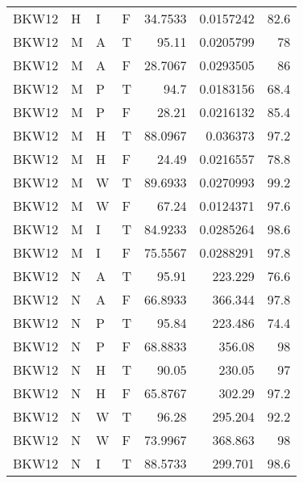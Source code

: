 \begin{longtable}{llllrrr}
    BKW12    & H         & I         & F          & 34.7533    & 0.0157242   & 82.6     \\
    BKW12    & M         & A         & T          & 95.11      & 0.0205799   & 78       \\
    BKW12    & M         & A         & F          & 28.7067    & 0.0293505   & 86       \\
    BKW12    & M         & P         & T          & 94.7       & 0.0183156   & 68.4     \\
    BKW12    & M         & P         & F          & 28.21      & 0.0216132   & 85.4     \\
    BKW12    & M         & H         & T          & 88.0967    & 0.036373    & 97.2     \\
    BKW12    & M         & H         & F          & 24.49      & 0.0216557   & 78.8     \\
    BKW12    & M         & W         & T          & 89.6933    & 0.0270993   & 99.2     \\
    BKW12    & M         & W         & F          & 67.24      & 0.0124371   & 97.6     \\
    BKW12    & M         & I         & T          & 84.9233    & 0.0285264   & 98.6     \\
    BKW12    & M         & I         & F          & 75.5567    & 0.0288291   & 97.8     \\
    BKW12    & N         & A         & T          & 95.91      & 223.229     & 76.6     \\
    BKW12    & N         & A         & F          & 66.8933    & 366.344     & 97.8     \\
    BKW12    & N         & P         & T          & 95.84      & 223.486     & 74.4     \\
    BKW12    & N         & P         & F          & 68.8833    & 356.08      & 98       \\
    BKW12    & N         & H         & T          & 90.05      & 230.05      & 97       \\
    BKW12    & N         & H         & F          & 65.8767    & 302.29      & 97.2     \\
    BKW12    & N         & W         & T          & 96.28      & 295.204     & 92.2     \\
    BKW12    & N         & W         & F          & 73.9967    & 368.863     & 98       \\
    BKW12    & N         & I         & T          & 88.5733    & 299.701     & 98.6     \\

\end{longtable}
